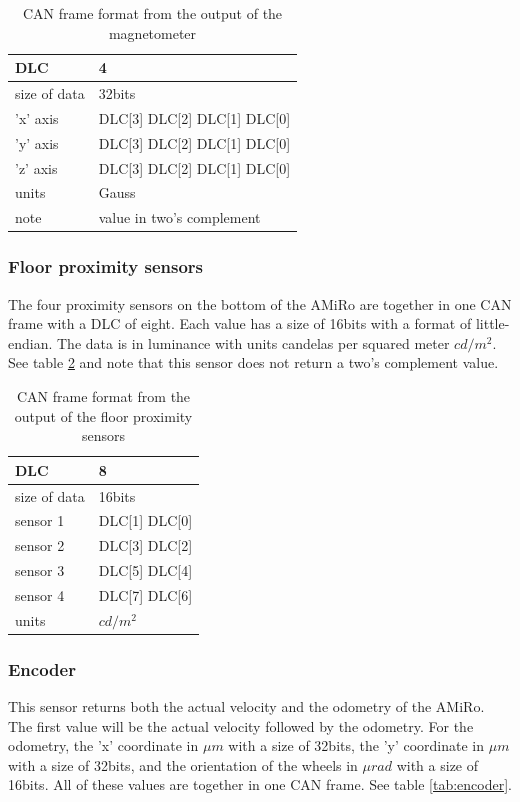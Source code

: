 \documentclass[12pt]{report}%
\begin{document}
\begin{table}[h!]
\centering
\begin{tabular}{|l|l|}
	\hline
	DLC						&	4														\\	\hline
	size of data	&	32bits											\\	\hline
	'x' axis			&	DLC[3] DLC[2] DLC[1] DLC[0]	\\	\hline
	'y'	axis			&	DLC[3] DLC[2] DLC[1] DLC[0]	\\	\hline
	'z'	axis			&	DLC[3] DLC[2] DLC[1] DLC[0]	\\	\hline
	units					&	Gauss												\\	\hline
	note					& value in two's complement 	\\	\hline
\end{tabular}
\caption{\label{tab:magnetometer} CAN frame format from the output of the magnetometer}
\end{table}

\subsubsection{Floor proximity sensors}
The four proximity sensors on the bottom of the AMiRo are together in one CAN frame with a DLC of eight. Each value has a size of 16bits with a format of little-endian. The data is in luminance with units candelas per squared meter $cd/m^2$. See table \ref{tab:floorprox} and note that this sensor does not return a two's complement value.

\begin{table}[h!]
\centering
\begin{tabular}{|l|l|}
	\hline
	DLC						&	8													\\	\hline
	size of data	&	16bits										\\	\hline
	sensor 1			&	DLC[1] DLC[0]							\\	\hline
  sensor 2			&	DLC[3] DLC[2]							\\	\hline
	sensor 3			&	DLC[5] DLC[4]							\\	\hline
	sensor 4			&	DLC[7] DLC[6]							\\	\hline
	units					&	$cd/m^2$									\\	\hline
\end{tabular}
\caption{\label{tab:floorprox} CAN frame format from the output of the floor proximity sensors}
\end{table}

\subsubsection{Encoder}
This sensor returns both the actual velocity and the odometry of the AMiRo. The first value will be the actual velocity followed by the odometry. For the odometry, the 'x' coordinate in $\mu m$ with a size of 32bits, the 'y' coordinate in $\mu m$ with a size of 32bits, and the orientation of the wheels in $\mu rad$ with a size of 16bits. All of these values are together in one CAN frame. See table \ref{tab:encoder}.
\end{document}
